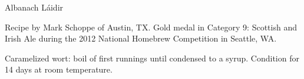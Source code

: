 \begin{recipe}{Albanach Láidir} %

\begin{aboutblock}
Recipe by Mark Schoppe of Austin, TX. Gold medal in Category 9: Scottish and Irish
Ale during the 2012 National Homebrew Competition in Seattle, WA.
\sourceaha
\end{aboutblock}


\begin{methodandtiming}

\begin{mashsteps}
\end{mashsteps}

\begin{fermentationsteps}
\end{fermentationsteps}

\begin{directions}
Caramelized wort: boil  of first runnings until condensed to a syrup.
Condition for 14 days at room temperature.
\end{directions}

\end{methodandtiming}

\recipebreak

\begin{ingredientsblock}

\begin{malts}
\end{malts}

\begin{hops}
\end{hops}


\end{ingredientsblock}

\end{recipe}

